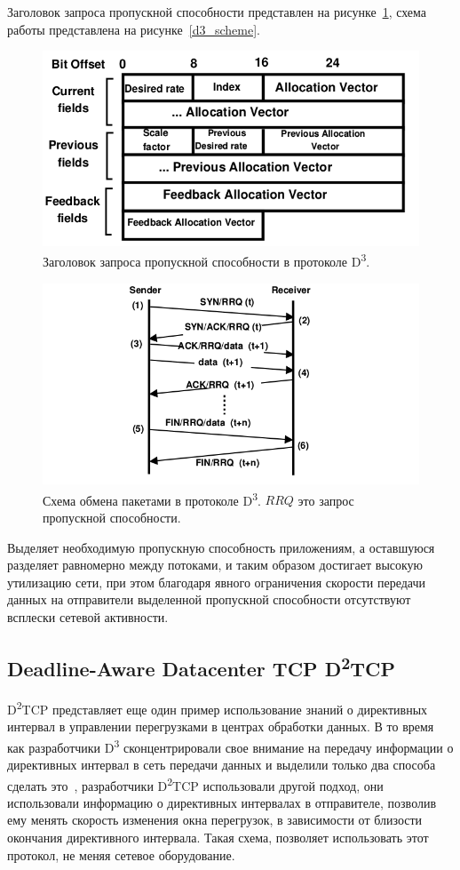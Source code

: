 \documentclass[14pt, a4paper,oneside]{extarticle}
\begin{document}
Заголовок запроса пропускной способности представлен на рисунке~\ref{header}, схема работы представлена на рисунке~\ref{d3_scheme}.
\begin{figure}
\includegraphics[width=0.7\linewidth]{header}
\caption{Заголовок запроса пропускной способности в протоколе D\textsuperscript{3}.}
\label{header}
\end{figure}
\begin{figure}
\includegraphics[width=0.6\linewidth]{d3_sheme}
\caption{Схема обмена пакетами в протоколе D\textsuperscript{3}. $RRQ$ это запрос пропускной способности.}
\label{d3_sheme}
\end{figure}

Выделяет необходимую пропускную способность приложениям, а оставшуюся разделяет равномерно между потоками, и таким образом достигает высокую утилизацию сети, при этом благодаря явного ограничения скорости передачи данных на отправители выделенной пропускной способности  отсутствуют всплески сетевой активности.

\subsection{Deadline-Aware Datacenter TCP D\textsuperscript{2}TCP}

D\textsuperscript{2}TCP представляет еще один пример использование знаний о директивных интервал в управлении перегрузками в центрах обработки данных. В то время как разработчики D\textsuperscript{3} сконцентрировали свое внимание на передачу информации о директивных интервал в сеть передачи данных и выделили только два способа сделать это~\cite{d3tcp}, разработчики D\textsuperscript{2}TCP использовали другой подход, они использовали информацию о директивных интервалах в отправителе, позволив ему менять скорость изменения окна перегрузок, в зависимости от близости окончания директивного интервала. Такая схема, позволяет использовать этот протокол, не меняя сетевое оборудование.
\end{document}
